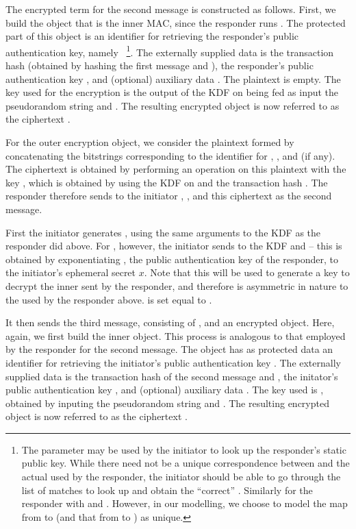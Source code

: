 {The encrypted term for the second message is constructed as follows. First, we build the \mCose{} object that is the inner MAC, since the responder runs \mStat. The protected part of this object is an identifier for retrieving the responder's public authentication key, namely \mIdcredr~\footnote{The \mIdcredr parameter may be used by the initiator to look up the responder's static public key. While there need not be a unique correspondence between \mIdcredr and the actual \mCredr used by the responder, the initiator should be able to go through the list of matches to look up and obtain the ``correct'' \mCredr. Similarly for the responder with \mIdcredi and \mCredi. However, in our modelling, we choose to model the map from \mIdcredr to \mCredr (and that from \mIdcredi to \mCredi) as unique.}. The externally supplied data is the transaction hash \mTHtwo (obtained by hashing the first message and \mGy),  the responder's public authentication key \mCredr, and (optional) auxiliary data \mADtwo. The plaintext is empty. The key used for the encryption \mKtwom is the output of the KDF on being fed as input the pseudorandom string \mPRKthree and \mTHtwo. The resulting encrypted object is now referred to as the ciphertext \mMactwo. 

For the outer encryption object, we consider the plaintext formed by concatenating the bitstrings corresponding to the identifier for \mCredr, \mMactwo, and \mADtwo (if any). The ciphertext is obtained by performing an \mXor{} operation on this plaintext with the key \mKtwoe, which is obtained by using the KDF on \mPRKtwo and the transaction hash \mTHtwo. The responder therefore sends to the initiator \mGy, \mCr, and this ciphertext as the second message.

First the initiator generates \mPRKtwo, using the same arguments to the KDF as the responder did above. For \mPRKthree, however, the initiator sends to the KDF \mPRKtwo and \mGrx -- this \mGrx is obtained by exponentiating \mCredr, the public authentication key of the responder, to the initiator's ephemeral secret $x$. Note that this will be used to generate a key to decrypt the inner \mMactwo sent by the responder, and therefore is asymmetric in nature to the \mGrx used by the responder above. \mPRKfour is set equal to \mPRKthree. 

It then sends the third message, consisting of \mCr, and an encrypted object. Here, again, we first build the inner \mCose{} object. This process is analogous to that employed by the responder for the second message. The \mCose{} object has as protected data an identifier for retrieving the initiator's public authentication key \mCredi. The externally supplied data is the transaction hash \mTHthree of the second message and \mTHtwo,  the initator's public authentication key \mCredi, and (optional) auxiliary data \mADthree. The key used is \mKthreem, obtained by inputing the pseudorandom string \mPRKthree and \mTHthree. The resulting encrypted object is now referred to as the ciphertext \mMacthree. 

}
